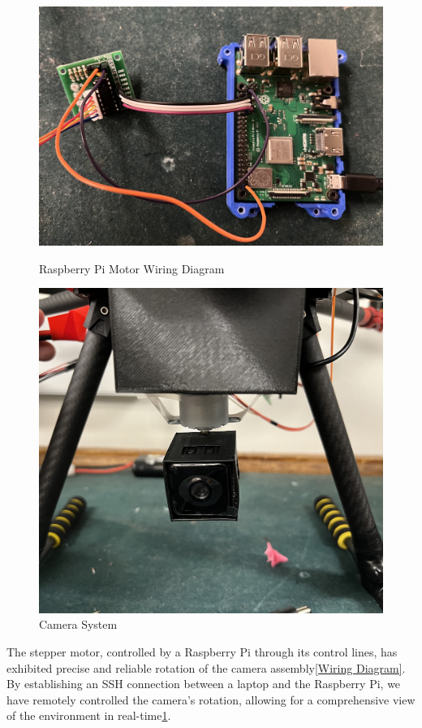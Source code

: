 \documentclass[conference]{IEEEtran}
\begin{document}
\begin{figure}[ht]
    \centering
    \begin{minipage}{0.24\textwidth}
        \centering
        \includegraphics[width=\linewidth]{figures/RaspberryPi_Motor Wiring_Diagram.jpg}
        \caption{Raspberry Pi Motor Wiring Diagram}
        \label{Wiring Diagram}
    \end{minipage}
    \hfill
    \begin{minipage}{0.24\textwidth}
        \centering
        \includegraphics[width=0.8\linewidth]{figures/camera_system.jpg}
        \caption{Camera System}
        \label{camera_system}
    \end{minipage}
\end{figure}

The stepper motor, controlled by a Raspberry Pi through its control lines, has exhibited precise and reliable rotation of the camera assembly\ref{Wiring Diagram}. By establishing an SSH connection between a laptop and the Raspberry Pi, we have remotely controlled the camera's rotation, allowing for a comprehensive view of the environment in real-time\ref{camera_system}.
\end{document}
